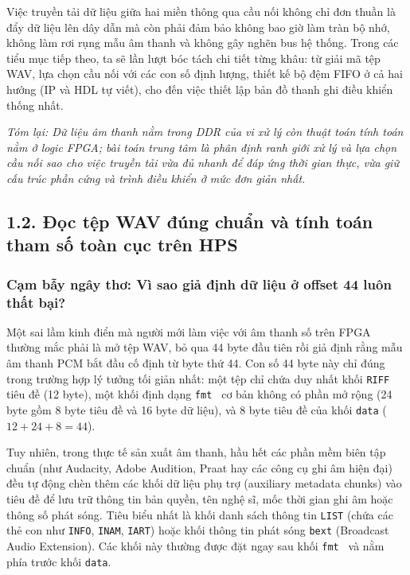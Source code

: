 Việc truyền tải dữ liệu giữa hai miền thông qua cầu nối không chỉ đơn thuần là đẩy dữ liệu lên dây dẫn mà còn phải đảm bảo không bao giờ làm tràn bộ nhớ, không làm rơi rụng mẫu âm thanh và không gây nghẽn bus hệ thống. Trong các tiểu mục tiếp theo, ta sẽ lần lượt bóc tách chi tiết từng khâu: từ giải mã tệp WAV, lựa chọn cầu nối với các con số định lượng, thiết kế bộ đệm FIFO ở cả hai hướng (IP và HDL tự viết), cho đến việc thiết lập bản đồ thanh ghi điều khiển thống nhất.

\textit{Tóm lại: Dữ liệu âm thanh nằm trong DDR của vi xử lý còn thuật toán tính toán nằm ở logic FPGA; bài toán trung tâm là phân định ranh giới xử lý và lựa chọn cầu nối sao cho việc truyền tải vừa đủ nhanh để đáp ứng thời gian thực, vừa giữ cấu trúc phần cứng và trình điều khiển ở mức đơn giản nhất.}

\subsection*{1.2. Đọc tệp WAV đúng chuẩn và tính toán tham số toàn cục trên HPS}

\subsubsection*{Cạm bẫy ngây thơ: Vì sao giả định dữ liệu ở offset 44 luôn thất bại?}
Một sai lầm kinh điển mà người mới làm việc với âm thanh số trên FPGA thường mắc phải là mở tệp WAV, bỏ qua 44 byte đầu tiên rồi giả định rằng mẫu âm thanh PCM bắt đầu cố định từ byte thứ 44. Con số 44 byte này chỉ đúng trong trường hợp lý tưởng tối giản nhất: một tệp chỉ chứa duy nhất khối \texttt{RIFF} tiêu đề (12 byte), một khối định dạng \texttt{fmt~} cơ bản không có phần mở rộng (24 byte gồm 8 byte tiêu đề và 16 byte dữ liệu), và 8 byte tiêu đề của khối \texttt{data} ($12 + 24 + 8 = 44$).

Tuy nhiên, trong thực tế sản xuất âm thanh, hầu hết các phần mềm biên tập chuẩn (như Audacity, Adobe Audition, Praat hay các công cụ ghi âm hiện đại) đều tự động chèn thêm các khối dữ liệu phụ trợ (auxiliary metadata chunks) vào tiêu đề để lưu trữ thông tin bản quyền, tên nghệ sĩ, mốc thời gian ghi âm hoặc thông số phát sóng. Tiêu biểu nhất là khối danh sách thông tin \texttt{LIST} (chứa các thẻ con như \texttt{INFO}, \texttt{INAM}, \texttt{IART}) hoặc khối thông tin phát sóng \texttt{bext} (Broadcast Audio Extension). Các khối này thường được đặt ngay sau khối \texttt{fmt~} và nằm phía trước khối \texttt{data}.

